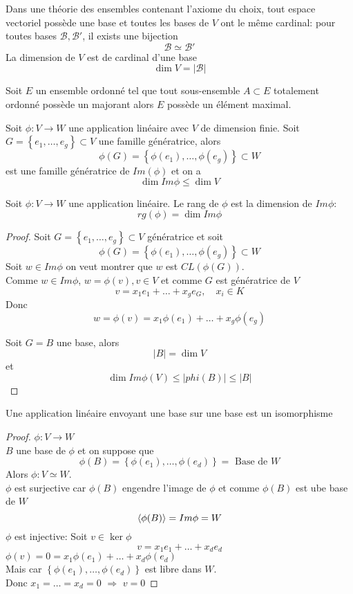 \documentclass[../main.tex]{subfiles}
\begin{document}
\begin{thm}
Dans une théorie des ensembles contenant l'axiome du choix, tout espace vectoriel possède une base et toutes les bases de $V$ ont le même cardinal: pour toutes bases $\mathcal{B}, \mathcal{B}'$, il exists une bijection 
\[ 
\mathcal{B} \simeq \mathcal{B}'
\]
La dimension de $V$ est de cardinal d'une base
\[ 
\dim V = |\mathcal{B}|
\]

\end{thm}
\begin{lemma}
	Soit $E$ un ensemble ordonné tel que tout sous-ensemble $A \subset E$ totalement ordonné possède un majorant alors $E$ possède un élément maximal.
\end{lemma}
\begin{propo}
	Soit $\phi: V \to W$ une application linéaire avec $V$ de dimension finie. Soit $G = \left\{ e_1, \ldots , e_g \right\} \subset V$ une famille génératrice, alors
	\[ 
		\phi( G) = \left\{ \phi( e_1), \ldots, \phi( e_g)  \right\} \subset W
	\]
	est une famille génératrice de $Im( \phi) $ et on a
	\[ 
	\dim Im \phi \leq \dim V
	\]
	
\end{propo}
\begin{defn}
Soit $\phi: V \to W$ une application linéaire. Le rang de  $\phi$ est la dimension de $Im \phi$:
\[ 
	rg( \phi) = \dim Im \phi
\]

\end{defn}
\begin{proof}
Soit $G = \left\{ e_1, \ldots, e_g \right\} \subset V$ génératrice et soit 
\[ 
	\phi( G) = \left\{ \phi( e_1) ,\ldots, \phi( e_g)  \right\} \subset W
\]
Soit $w \in Im \phi$ on veut montrer que $w$ est $CL( \phi( G) ) $.\\
Comme $w \in Im \phi$, $w = \phi( v), v\in V $ et comme $G$ est génératrice de $V$ 
\[ 
v= x_1 e_1 + \ldots + x_g e_G, \quad x_i \in K
\]
Donc 
\[ 
	w= \phi( v) = x_1 \phi( e_1)  + \ldots + x_g \phi( e_g) 
\]

Soit $G= B$ une base, alors
\[ 
|B| = \dim V
\]
et 
\[ 
	\dim Im \phi( V) \leq |phi( B) |\leq |B|
\]

\end{proof}
\begin{crly}
Une application linéaire envoyant une base sur une base est un isomorphisme
\end{crly}
\begin{proof}
$\phi: V \to W$\\
$B$ une base de $\phi$ et on suppose que
\[ 
	\phi( B) = \left\{ \phi( e_1) , \ldots, \phi( e_d)  \right\} = \text{ Base de  } W
\]
Alors $\phi: V \simeq W$.\\
$\phi$ est surjective car $\phi( B) $ engendre l'image de $\phi$ et comme $\phi( B) $ est ube base de $W$ 
\[ 
	\left\langle\phi( B) \right\rangle = Im \phi = W
\]
$\phi$ est injective: Soit $v \in \ker \phi$ 
\[ 
v = x_1e_1 + \ldots + x_d e_d
\]
$\phi( v) = 0 = x_1 \phi( e_1) + \ldots + x_d \phi( e_d) $\\
Mais car $ \left\{ \phi( e_1) , \ldots, \phi( e_d)  \right\} $ est libre dans $W$.\\
Donc $x_1= \ldots = x_d = 0$ $\Rightarrow$  $v=0$
\end{proof}
\end{document}
